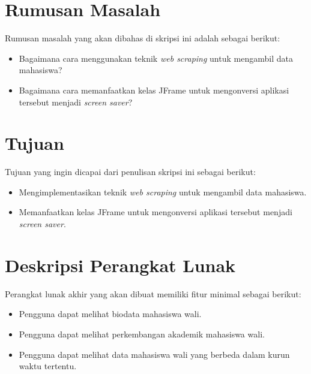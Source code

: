 \documentclass[a4paper,twoside]{article}
\begin{document}
\section{Rumusan Masalah}
Rumusan masalah yang akan dibahas di skripsi ini adalah sebagai berikut:
\begin{itemize}
	\item Bagaimana cara menggunakan teknik \textit{web scraping} untuk mengambil data mahasiswa?
	\item Bagaimana cara memanfaatkan kelas JFrame untuk mengonversi aplikasi tersebut menjadi \textit{screen saver}?
\end{itemize}   

\section{Tujuan}
Tujuan yang ingin dicapai dari penulisan skripsi ini sebagai berikut:
\begin{itemize}
    \item Mengimplementasikan teknik \textit{web scraping} untuk mengambil data mahasiswa.
    \item Memanfaatkan kelas JFrame untuk mengonversi aplikasi tersebut menjadi \textit{screen saver}.
\end{itemize}

\section{Deskripsi Perangkat Lunak}
Perangkat lunak akhir yang akan dibuat memiliki fitur minimal sebagai berikut:
\begin{itemize}
	\item Pengguna dapat melihat biodata mahasiswa wali.
	\item Pengguna dapat melihat perkembangan akademik mahasiswa wali.
	\item Pengguna dapat melihat data mahasiswa wali yang berbeda dalam kurun waktu tertentu.
\end{itemize}
\end{document}

